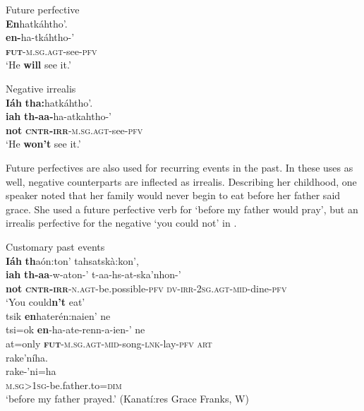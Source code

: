 \documentclass[output=paper,colorlinks,citecolor=brown]{langscibook}
\begin{document}
{\ea\label{ex:moh:19} Future perfective\\
    \glll \textbf{En}hatkáhtho’. \\
         \textbf{en-}ha-tkáhtho-’\\
         \textbf{\textsc{fut}}\textsc{-m.sg.agt}-see-\textsc{pfv} \\
    \glt ‘He \textbf{will} see it.’
\z}

{
\ea\label{ex:moh:20} Negative irrealis\\
    \glll \textbf{Iáh} \textbf{tha:}hatkáhtho’. \\
         \textbf{iah} \textbf{th-aa-}ha-atkahtho-’\\
         \textbf{not} \textbf{\textsc{cntr-irr}}\textsc{-m.sg.agt}-see\textsc{-pfv} \\
    \glt ‘He \textbf{won’t} see it.’
\z  }

Future perfectives are also used for recurring events in the past. In these uses as well, negative counterparts are inflected as irrealis. Describing her childhood, one speaker noted that her family would never begin to eat before her father said grace. She used a future perfective verb for ‘before my father would pray’, but an irrealis perfective for the negative ‘you could not’ in . 

\ea\label{ex:moh:21} Customary past events \\
    \glll \textbf{Iáh} \textbf{th}aón:ton’ tahsatskà:kon’, \\ 
         \textbf{iah} \textbf{th-aa}-w-aton-’ t-aa-hs-at-ska’nhon-’ \\ 
         \textbf{not} \textbf{\textsc{cntr-irr}}-\textsc{n.agt}-be.possible-\textsc{pfv} \textsc{dv-irr-2sg.agt-mid}-dine-\textsc{pfv} \\
    \glt ‘You could\textbf{n’t} eat’\\  \medskip
    \glll tsik \textbf{en}haterén:naien’ ne \\ 
          tsi=ok \textbf{en}-ha-ate-renn-a-ien-’ ne \\
          at=only \textbf{\textsc{fut}}\textsc{-m.sg.agt-mid}-song-\textsc{lnk-}lay-\textsc{pfv} \textsc{art} \\
        \glt 
    {\qquad}  \glll rake’níha. \\ 
          rake-’ni=ha \\
          \textsc{m.sg>1sg}-be.father.to=\textsc{dim} \\
    \glt ‘before my father prayed.’ (Kanatí:res Grace Franks, W) 
\z
\end{document}
